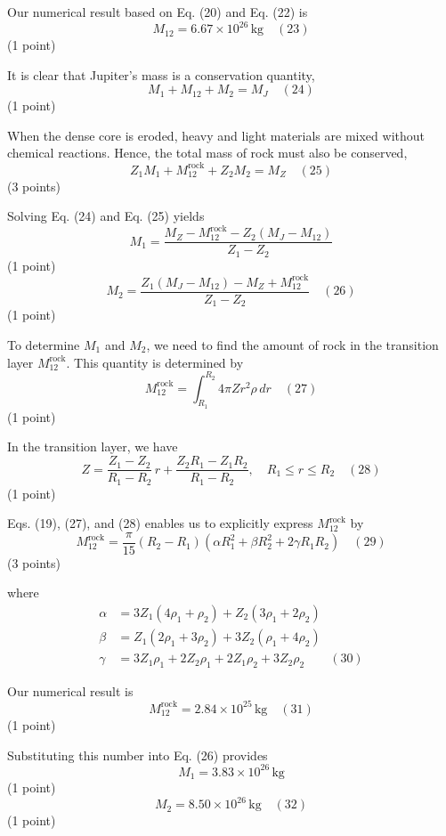 \begin{description}
  Our numerical result based on Eq. (20) and Eq. (22) is
  \[ M_{12} = 6.67 \times 10^{26}\,\mathrm{kg} \quad (23) \]
  \hfill(1 point)

\item[(c)] It is clear that Jupiter's mass is a conservation quantity,
  \[ M_1 + M_{12} + M_2 = M_J \quad (24) \]
  \hfill(1 point)

  When the dense core is eroded, heavy and light materials are mixed without
  chemical reactions. Hence, the total mass of rock must also be conserved,
  \[ Z_1 M_1 + M_{12}^{\mathrm{rock}} + Z_2 M_2 = M_Z \quad (25) \]
  \hfill(3 points)

  Solving Eq. (24) and Eq. (25) yields
  \[ M_1 = \frac{M_Z - M_{12}^{\mathrm{rock}} - Z_2(M_J - M_{12})}{Z_1 - Z_2} \]
  \hfill(1 point)
  \[ M_2 = \frac{Z_1(M_J - M_{12}) - M_Z + M_{12}^{\mathrm{rock}}}{Z_1 - Z_2}
     \quad (26) \]
  \hfill(1 point)

  To determine $M_1$ and $M_2$, we need to find the amount of rock in the
  transition layer $M_{12}^{\mathrm{rock}}$. This quantity is determined by
  \[ M_{12}^{\mathrm{rock}} = \int_{R_1}^{R_2} 4\pi Z r^2 \rho\,dr \quad (27) \]
  \hfill(1 point)

  In the transition layer, we have
  \[ Z = \frac{Z_1 - Z_2}{R_1 - R_2}\,r + \frac{Z_2 R_1 - Z_1 R_2}{R_1 - R_2},
     \quad R_1 \le r \le R_2 \quad (28) \]
  \hfill(1 point)

  Eqs. (19), (27), and (28) enables us to explicitly express
  $M_{12}^{\mathrm{rock}}$ by
  \[ M_{12}^{\mathrm{rock}} = \frac{\pi}{15}(R_2 - R_1)
     \left(\alpha R_1^2 + \beta R_2^2 + 2\gamma R_1 R_2\right) \quad (29) \]
  \hfill(3 points)

  where
  \begin{align*}
    \alpha &= 3Z_1(4\rho_1 + \rho_2) + Z_2(3\rho_1 + 2\rho_2) \\
    \beta  &= Z_1(2\rho_1 + 3\rho_2) + 3Z_2(\rho_1 + 4\rho_2) \\
    \gamma &= 3Z_1\rho_1 + 2Z_2\rho_1 + 2Z_1\rho_2 + 3Z_2\rho_2
    \qquad (30)
  \end{align*}

  Our numerical result is
  \[ M_{12}^{\mathrm{rock}} = 2.84 \times 10^{25}\,\mathrm{kg} \quad (31) \]
  \hfill(1 point)

  Substituting this number into Eq. (26) provides
  \[ M_1 = 3.83 \times 10^{26}\,\mathrm{kg} \]
  \hfill(1 point)
  \[ M_2 = 8.50 \times 10^{26}\,\mathrm{kg} \quad (32) \]
  \hfill(1 point)
\end{description}
